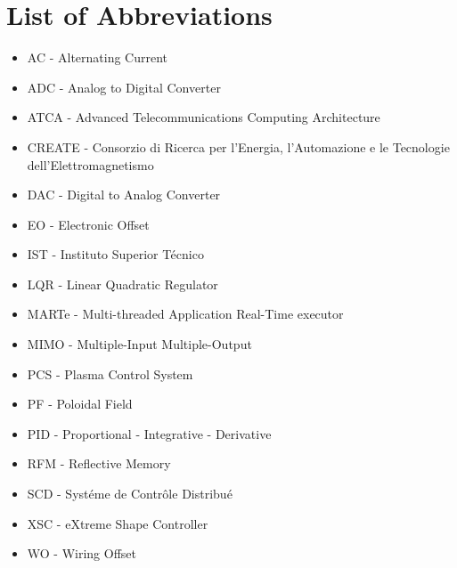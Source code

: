\chapter*{List of Abbreviations}

\begin{itemize}
\item AC - Alternating Current
\item ADC - Analog to Digital Converter
\item ATCA -  Advanced Telecommunications Computing Architecture 
\item CREATE - Consorzio di Ricerca per l'Energia, l'Automazione e le Tecnologie dell'Elettromagnetismo
\item DAC - Digital to Analog Converter
\item EO - Electronic Offset
\item IST - Instituto Superior Técnico 
\item LQR - Linear Quadratic Regulator
\item MARTe - Multi-threaded Application Real-Time executor
\item MIMO - Multiple-Input Multiple-Output
\item PCS - Plasma Control System
\item PF - Poloidal Field 
\item PID - Proportional - Integrative - Derivative
\item RFM - Reflective Memory
\item SCD - Syst\'eme de Contr\^ole Distribu\'e
\item XSC - eXtreme Shape Controller
\item WO - Wiring Offset
\end{itemize}


